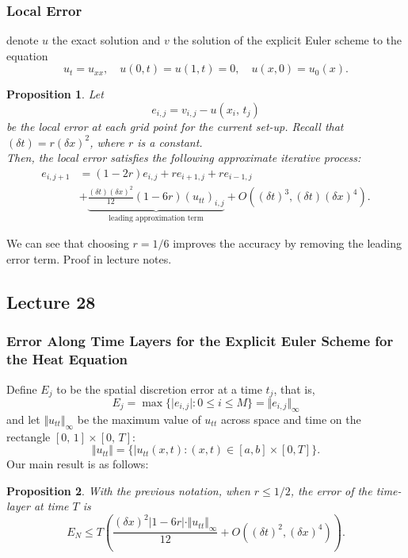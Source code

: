 \documentclass{article}
\newtheorem{proposition}{Proposition}
\begin{document}
\subsubsection{Local Error}
denote $u$ the exact solution and $v$ the solution of the explicit Euler scheme to the equation
\begin{equation}
    u_t = u_{xx},\quad u(0,t) = u(1,t) = 0,\quad u(x,0) = u_0(x).
\end{equation}
\begin{proposition}
    Let
    \begin{equation}
        e_{i,j} = v_{i,j} - u(x_i,\,t_j)\nonumber
    \end{equation}
    be the local error at each grid point for the current set-up. Recall that $(\delta t) = r(\delta x)^2$, where $r$ is a constant.\\
    Then, the local error satisfies the following approximate iterative process:
    \begin{align}
        e_{i,j+1} &= (1-2r)e_{i,j} + re_{i+1,j} + re_{i-1,j} \nonumber\\
        &+ \underbrace{\frac{(\delta t)(\delta x)^2}{12}(1-6r)(u_{tt})_{i,j}}_{\text{leading approximation term}} + O((\delta t)^3,(\delta t)(\delta x)^4). \nonumber
    \end{align}
\end{proposition}
We can see that choosing $r=1/6$ improves the accuracy by removing the leading error term. Proof in lecture notes.

\subsection{Lecture 28}
\subsubsection{Error Along Time Layers for the Explicit Euler Scheme for the Heat Equation}
Define $E_j$ to be the spatial discretion error at a time $t_j$, that is,
\begin{equation}
    E_j = \max\{ \vert e_{i,j}\vert : 0\leq i \leq M \} = \Vert e_{i,j}\Vert_\infty \nonumber
\end{equation}
and let $\Vert u_{tt}\Vert_\infty$ be the maximum value of $u_{tt}$ across space and time on the rectangle $[0,\,1]\times[0,\,T]$:
\begin{equation}
    \Vert u_{tt}\Vert = \{ \vert u_{tt}(x,t):(x,t)\in[a,b]\times[0,T] \}.
\end{equation}    
Our main result is as follows:
\begin{proposition}
    With the previous notation, when $r\leq 1/2$, the error of the time-layer at time $T$ is
    \begin{equation}
        E_N\leq T\left( \frac{(\delta x)^2 \vert 1-6r\vert\cdot\Vert u_{tt}\Vert_\infty }{12} + O((\delta t)^2,(\delta x)^4) \right). \nonumber
    \end{equation}
\end{proposition}
\end{document}
